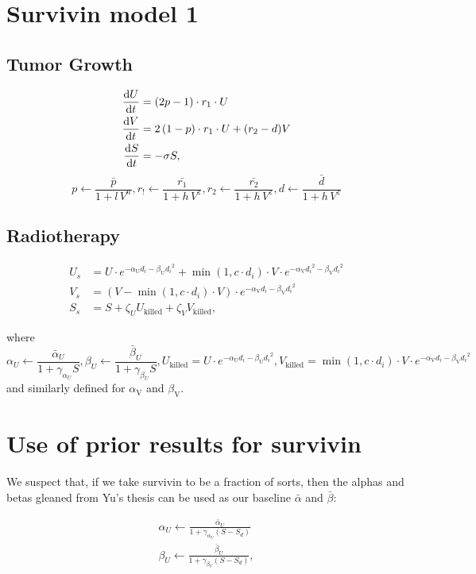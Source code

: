 \documentclass[12pt]{article}
\begin{document}
\section*{Survivin model 1}
\subsection*{Tumor Growth}
\begin{align*}
\dv{U}{t}&=\left(2p-1\right)\cdot r_1\cdot U\\
\dv{V}{t}&=2\left(1-p\right)\cdot r_1\cdot U +(r_2-d)V\\
\dv{S}{t}&=-\sigma S,
\end{align*}
\[p\leftarrow\frac{\bar{p}}{1+l\,V^n},r_!\leftarrow\frac{\bar{r_1}}{1+h\,V^z},r_2\leftarrow\frac{\bar{r_2}}{1+h\,V^z},d\leftarrow\frac{\bar{d}}{1+h\,V^z}\]
\subsection*{Radiotherapy}
\begin{align*}
U_s &= U\cdot e^{-\alpha_{\text{U}}{d_i}-\beta_{\text{U}}{d_i}^2} + \min(1,c\cdot d_i)\cdot V\cdot e^{-\alpha_{\text{V}}{d_i}^2-\beta_{\text{V}}{d_i}^2}\\
V_s &= (V - \min(1,c\cdot d_i)\cdot V)\cdot e^{-\alpha_{
\text{V}}{d_i}-\beta_{\text{V}}{d_i}^2}\\
S_{s} &= S + \zeta_U U_{\text{killed}} + \zeta_V V_{\text{killed}},
\end{align*}

where \[\alpha_U \leftarrow \frac{\bar{\alpha}_U}{1+\gamma_{\alpha_U}S}, \beta_U \leftarrow \frac{\bar{\beta}_U}{1+\gamma_{\beta_U}S},U_{\text{killed}} = U\cdot e^{-\alpha_{\text{U}}{d_i}-\beta_{\text{U}}{d_i}^2}, V_{\text{killed}}=\min(1,c\cdot d_i)\cdot V\cdot e^{-\alpha_{\text{V}}{d_i}-\beta_{\text{V}}{d_i}^2}\] and similarly defined for $\alpha_\text{V}$ and $\beta_\text{V}$.

\section*{Use of prior results for survivin}
We suspect that, if we take survivin to be a fraction of sorts, then the alphas and betas gleaned from Yu's thesis can be used as our baseline $\bar{\alpha}$ and $\bar{\beta}$:

\begin{align*}
\alpha_U \leftarrow \frac{\bar{\alpha}_U}{1+\gamma_{\alpha_U}(S-S_d)}\\
 \beta_U \leftarrow \frac{\bar{\beta}_U}{1+\gamma_{\beta_U}(S-S_d)},
\end{align*}
\end{document}
